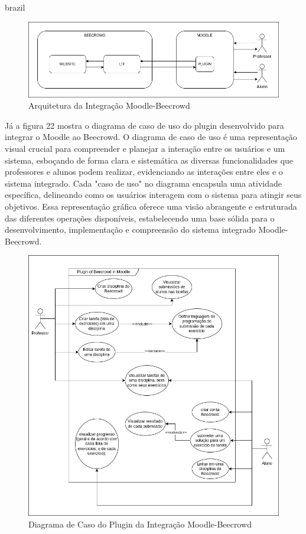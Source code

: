 \begin{otherlanguage*}{brazil}
\begin{figure}[h!]
    \centering
            \caption{Arquitetura da Integração Moodle-Beecrowd}
            \label{fig:ModeloConceitual}
        \includegraphics[scale=0.5]{pictures/arquitetura.png}
\end{figure}

Já a figura 22 mostra o diagrama de caso de uso do plugin desenvolvido para integrar o Moodle ao Beecrowd. O diagrama de caso de uso é uma representação visual crucial para compreender e planejar a interação entre os usuários e um sistema, esboçando de forma clara e sistemática as diversas funcionalidades que professores e alunos podem realizar, evidenciando as interações entre eles e o sistema integrado. Cada "caso de uso" no diagrama encapsula uma atividade específica, delineando como os usuários interagem com o sistema para atingir seus objetivos. Essa representação gráfica oferece uma visão abrangente e estruturada das diferentes operações disponíveis, estabelecendo uma base sólida para o desenvolvimento, implementação e compreensão do sistema integrado Moodle-Beecrowd.

\begin{figure}[h!]
    \centering
            \caption{Diagrama de Caso do Plugin da Integração Moodle-Beecrowd}
            \label{fig:ModeloConceitual}
        \includegraphics[scale=0.6]{pictures/caso_de_uso.png}
\end{figure}


\end{otherlanguage*}
